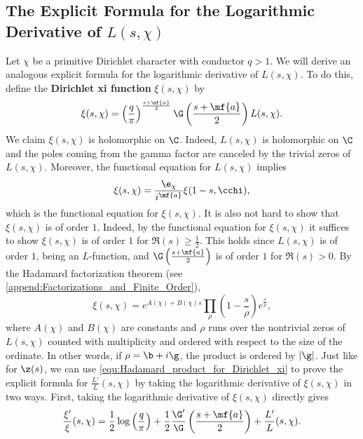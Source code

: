     \subsection*{The Explicit Formula for the Logarithmic Derivative of \texorpdfstring{$L(s,\chi)$}{L(s,\chi)}}
      Let $\chi$ be a primitive Dirichlet character with conductor $q > 1$. We will derive an analogous explicit formula for the logarithmic derivative of $L(s,\chi)$. To do this, define the \textbf{Dirichlet xi function} $\xi(s,\chi)$ by
      \[
        \xi(s,\chi) = \left(\frac{q}{\pi}\right)^{\frac{s+\mf{a}}{2}}\G\left(\frac{s+\mf{a}}{2}\right)L(s,\chi).
      \]
      We claim $\xi(s,\chi)$ is holomorphic on $\C$. Indeed, $L(s,\chi)$ is holomorphic on $\C$ and the poles coming from the gamma factor are canceled by the trivial zeros of $L(s,\chi)$. Moreover, the functional equation for $L(s,\chi)$ implies
      \[
        \xi(s,\chi) = \frac{\e_{\chi}}{i^{\mf{a}}}\xi(1-s,\cchi),
      \]
      which is the functional equation for $\xi(s,\chi)$. It is also not hard to show that $\xi(s,\chi)$ is of order $1$. Indeed, by the functional equation for $\xi(s,\chi)$ it suffices to show $\xi(s,\chi)$ is of order $1$ for $\Re(s) \ge \frac{1}{2}$. This holds since $L(s,\chi)$ is of order $1$, being an $L$-function, and $\G\left(\frac{s+\mf{a}}{2}\right)$ is of order $1$ for $\Re(s) > 0$. By the Hadamard factorization theorem (see \cref{append:Factorizations_and_Finite_Order}),
      \begin{equation}\label{equ:Hadamard_product_for_Dirichlet_xi}
        \xi(s,\chi) = e^{A(\chi)+B(\chi)s}\prod_{\rho}\left(1-\frac{s}{\rho}\right)e^{\frac{s}{\rho}},
      \end{equation}
      where $A(\chi)$ and $B(\chi)$ are constants and $\rho$ runs over the nontrivial zeros of $L(s,\chi)$ counted with multiplicity and ordered with respect to the size of the ordinate. In other words, if $\rho = \b+i\g$, the product is ordered by $|\g|$. Just like for $\z(s)$, we can use \cref{equ:Hadamard_product_for_Dirichlet_xi} to prove the explicit formula for $\frac{L'}{L}(s,\chi)$ by taking the logarithmic derivative of $\xi(s,\chi)$ in two ways. First, taking the logarithmic derivative of $\xi(s,\chi)$ directly gives
      \begin{equation}\label{equ:logarithmic_derivative_Dirichlet_xi_1}
        \frac{\xi'}{\xi}(s,\chi) = \frac{1}{2}\log\left(\frac{q}{\pi}\right)+\frac{1}{2}\frac{\G'}{\G}\left(\frac{s+\mf{a}}{2}\right)+\frac{L'}{L}(s,\chi).
      \end{equation}
